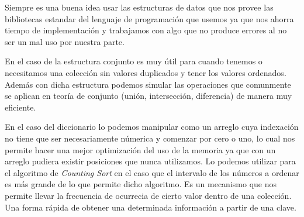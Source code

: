 Siempre es una buena idea usar las estructuras de datos que nos provee las bibliotecas estandar del lenguaje de programación que usemos ya que nos ahorra tiempo de implementación y trabajamos con algo que no produce errores al no ser un mal uso por nuestra parte.

En el caso de la estructura conjunto es muy útil para cuando tenemos o necesitamos una colección sin valores duplicados y tener los valores ordenados. Además con dicha estructura podemos simular las operaciones que comunmente se aplican en teoría de conjunto (unión, intersección, diferencia) de manera muy eficiente.

En el caso del diccionario lo podemos manipular como un arreglo cuya indexación no tiene que ser necesariamente númerica y comenzar por cero o uno, lo cual nos permite hacer una mejor optimización del uso de la memoria ya que con un arreglo pudiera existir posiciones que nunca utilizamos. Lo podemos utilizar para el algoritmo de \emph{Counting Sort} en el caso que el intervalo de los números a ordenar es más grande de lo que permite dicho algoritmo. Es un mecanismo que nos permite llevar la frecuencia de ocurrecia de cierto valor dentro de una colección. Una forma rápida de obtener una determinada información a partir de una clave. 